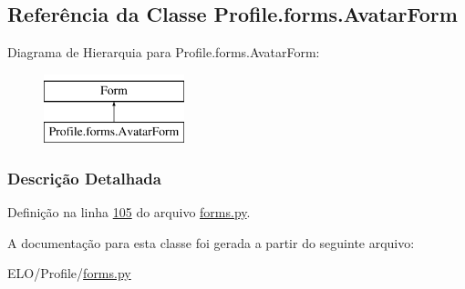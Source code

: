 \hypertarget{classProfile_1_1forms_1_1AvatarForm}{\subsection{Referência da Classe Profile.\-forms.\-Avatar\-Form}
\label{classProfile_1_1forms_1_1AvatarForm}
}
Diagrama de Hierarquia para Profile.\-forms.\-Avatar\-Form\-:\begin{figure}[H]
\begin{center}
\leavevmode
\includegraphics[height=2.000000cm]{da/da4/classProfile_1_1forms_1_1AvatarForm}
\end{center}
\end{figure}


\subsubsection{Descrição Detalhada}


Definição na linha \hyperlink{Profile_2forms_8py_source_l00105}{105} do arquivo \hyperlink{Profile_2forms_8py_source}{forms.\-py}.



A documentação para esta classe foi gerada a partir do seguinte arquivo\-:\begin{DoxyCompactItemize}
\item 
E\-L\-O/\-Profile/\hyperlink{Profile_2forms_8py}{forms.\-py}\end{DoxyCompactItemize}
